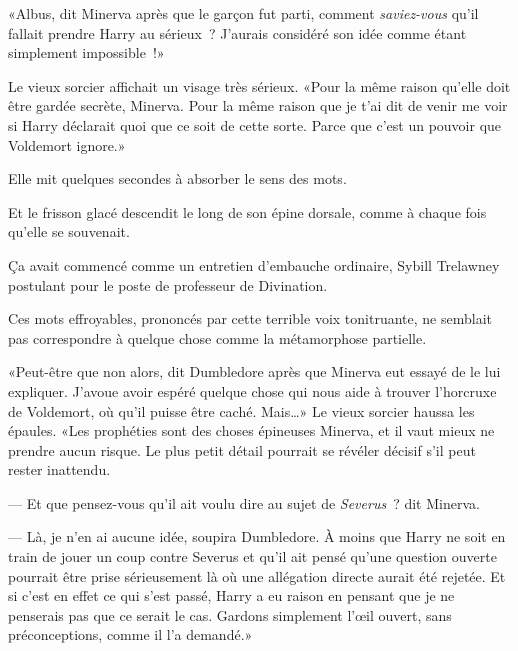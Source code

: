 \later

«Albus, dit Minerva après que le garçon fut parti, comment \emph{saviez-vous} qu'il fallait prendre Harry au sérieux~? J'aurais considéré son idée comme étant simplement impossible~!»

Le vieux sorcier affichait un visage très sérieux. «Pour la même raison qu'elle doit être gardée secrète, Minerva. Pour la même raison que je t'ai dit de venir me voir si Harry déclarait quoi que ce soit de cette sorte. Parce que c'est un pouvoir que Voldemort ignore.»

Elle mit quelques secondes à absorber le sens des mots.

Et le frisson glacé descendit le long de son épine dorsale, comme à chaque fois qu'elle se souvenait.

Ça avait commencé comme un entretien d'embauche ordinaire, Sybill Trelawney postulant pour le poste de professeur de Divination.


Ces mots effroyables, prononcés par cette terrible voix tonitruante, ne semblait pas correspondre à quelque chose comme la métamorphose partielle.

«Peut-être que non alors, dit Dumbledore après que Minerva eut essayé de le lui expliquer. J'avoue avoir espéré quelque chose qui nous aide à trouver l'horcruxe de Voldemort, où qu'il puisse être caché. Mais…» Le vieux sorcier haussa les épaules. «Les prophéties sont des choses épineuses Minerva, et il vaut mieux ne prendre aucun risque. Le plus petit détail pourrait se révéler décisif s'il peut rester inattendu.

--- Et que pensez-vous qu'il ait voulu dire au sujet de \emph{Severus}~? dit Minerva.

--- Là, je n'en ai aucune idée, soupira Dumbledore. À moins que Harry ne soit en train de jouer un coup contre Severus et qu'il ait pensé qu'une question ouverte pourrait être prise sérieusement là où une allégation directe aurait été rejetée. Et si c'est en effet ce qui s'est passé, Harry a eu raison en pensant que je ne penserais pas que ce serait le cas. Gardons simplement l'œil ouvert, sans préconceptions, comme il l'a demandé.»

